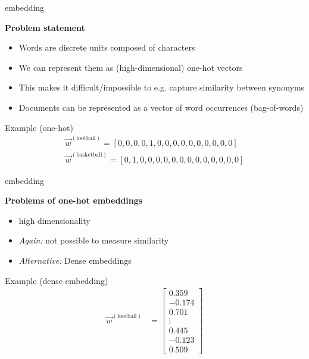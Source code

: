 \documentclass[11pt,compress,t,notes=noshow, xcolor=table]{beamer}
\begin{document}

\begin{vbframe}{embedding}

\vfill

\textbf{Problem statement}

\begin{itemize}
	\item Words are discrete units composed of characters
	\item We can represent them as (high-dimensional) one-hot vectors
	\item This makes it difficult/impossible to e.g. capture similarity between synonyms
	\item Documents can be represented as a vector of word occurrences (bag-of-words)
\end{itemize}
	
\begin{exampleblock}{Example (one-hot)}
	\begin{align*}
			\vec w^{({\text{football}})} = [0,0,0,0,1,0,0,0,0,0,0,0,0,0,0]\\\vec w^{({\text{basketball}})} = [0,1,0,0,0,0,0,0,0,0,0,0,0,0,0]
	\end{align*}
\end{exampleblock}

\vfill

\end{vbframe}


\begin{vbframe}{embedding}

\vfill

\textbf{Problems of one-hot embeddings}

\begin{itemize}
	\item high dimensionality
	\item \textit{Again:} not possible to measure similarity
	\item \textit{Alternative:} Dense embeddings
\end{itemize}

\begin{exampleblock}{Example (dense embedding)}
	\begin{align*}
				\vec w^{({\text{football}})} &= \begin{bmatrix}
            0.359 \\
           -0.174 \\
            0.701 \\
           \vdots \\
            0.445 \\
           -0.123 \\
            0.509 
         \end{bmatrix}
	\end{align*}
\end{exampleblock}

\vfill

\end{vbframe}
\end{document}
